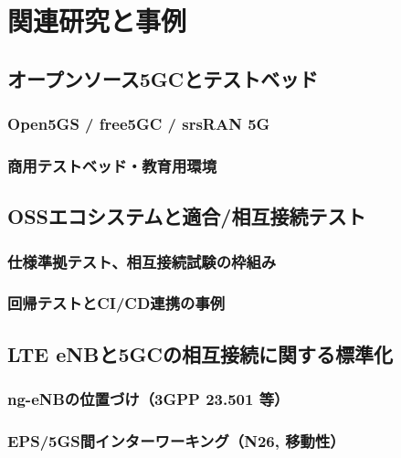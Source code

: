 \chapter{関連研究と事例}
\label{chap:related}

\section{オープンソース5GCとテストベッド}
\subsection{Open5GS / free5GC / srsRAN 5G}
\subsection{商用テストベッド・教育用環境}

\section{OSSエコシステムと適合/相互接続テスト}
\subsection{仕様準拠テスト、相互接続試験の枠組み}
\subsection{回帰テストとCI/CD連携の事例}

\section{LTE eNBと5GCの相互接続に関する標準化}
\subsection{ng-eNBの位置づけ（3GPP 23.501 等）}
\subsection{EPS/5GS間インターワーキング（N26, 移動性）}

